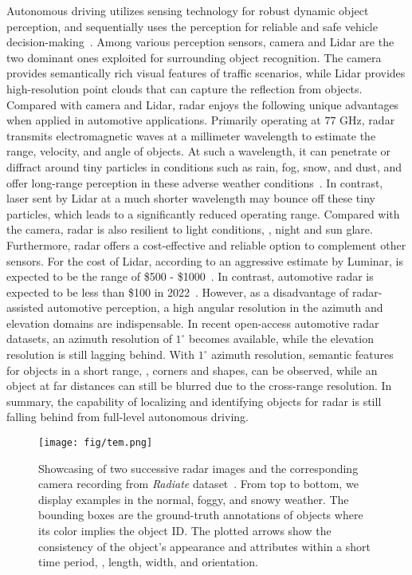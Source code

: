 \documentclass[10pt,twocolumn,letterpaper]{article}
\begin{document}
Autonomous driving utilizes sensing technology for robust dynamic object perception, and sequentially uses the perception for reliable and safe vehicle decision-making~\cite{yurtsever2020survey}. Among various perception sensors, camera and Lidar are the two dominant ones exploited for surrounding object recognition. The camera provides semantically rich visual features of traffic scenarios, while Lidar provides high-resolution point clouds that can capture the reflection from objects. Compared with camera and Lidar, radar enjoys the following unique advantages when applied in automotive applications. Primarily operating at $77$ GHz, radar transmits electromagnetic waves at a millimeter wavelength to estimate the range, velocity, and angle of objects. At such a wavelength, it can penetrate or diffract around tiny particles in conditions such as rain, fog, snow, and dust, and offer long-range perception in these adverse weather conditions~\cite{ZengNickolaou14}. In contrast, laser sent by Lidar at a much shorter wavelength may bounce off these tiny particles, which leads to a significantly reduced operating range. Compared with the camera, radar is also resilient to light conditions, \eg, night and sun glare. Furthermore, radar offers a cost-effective and reliable option to complement other sensors. For the cost of Lidar, according to an aggressive estimate by Luminar, is expected to be the range of \$500 - \$1000~\cite{lidar_price}. In contrast, automotive radar is expected to be less than \$100 in 2022~\cite{radar_price}. However, as a disadvantage of radar-assisted automotive perception, a high angular resolution in the azimuth and elevation domains are indispensable. In recent open-access automotive radar datasets, an azimuth resolution of $1^{\circ}$ becomes available, while the elevation resolution is still lagging behind. With $1^{\circ}$ azimuth resolution, semantic features for objects in a short range, \eg, corners and shapes, can be observed, while an object at far distances can still be blurred due to the cross-range resolution. In summary, the capability of localizing and identifying objects for radar is still falling behind from full-level autonomous driving.

\begin{figure}[t]
    \centering
    \texttt{[image: fig/tem.png]}\vspace{-2mm}
    \caption{Showcasing of two successive radar images and the corresponding camera recording from \textit{Radiate} dataset~\cite{sheeny2020radiate}. From top to bottom, we display examples in the normal, foggy, and snowy weather. The bounding boxes are the ground-truth annotations of objects where its color implies the object ID. The plotted arrows show the consistency of the object's appearance and attributes within a short time period, \eg, length, width, and orientation.}
    \label{fig:tem}
    \vspace{-5.5mm}
\end{figure}
\end{document}
